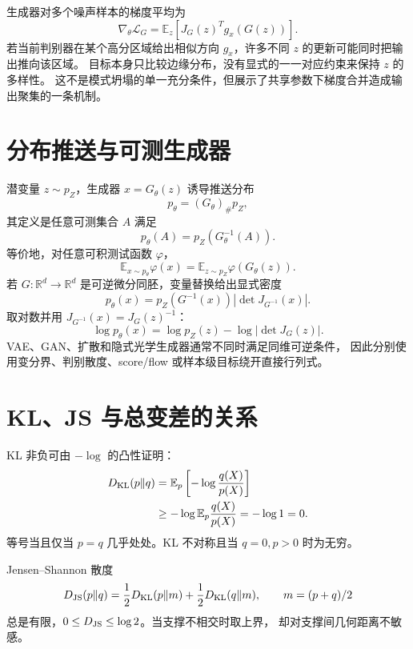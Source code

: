 \documentclass[11pt]{article}
\numberwithin{equation}{section}
\newcommand{\R}{\mathbb{R}}
\newcommand{\E}{\mathbb{E}}
\newcommand{\1}{\mathbf{1}}
\newcommand{\cL}{\mathcal{L}}
\begin{document}
生成器对多个噪声样本的梯度平均为
\begin{equation}
 \nabla_\theta\cL_G
 =\E_z[J_G(z)^Tg_x(G(z))].
\end{equation}
若当前判别器在某个高分区域给出相似方向 $g_x$，许多不同 $z$ 的更新可能同时把输出推向该区域。
目标本身只比较边缘分布，没有显式的一一对应约束来保持 $z$ 的多样性。
这不是模式坍塌的单一充分条件，但展示了共享参数下梯度合并造成输出聚集的一条机制。

\section{分布推送与可测生成器}

潜变量 $z\sim p_Z$，生成器 $x=G_\theta(z)$ 诱导推送分布
\begin{equation}
 p_\theta=(G_\theta)_\#p_Z,
\end{equation}
其定义是任意可测集合 $A$ 满足
\begin{equation}
 p_\theta(A)=p_Z(G_\theta^{-1}(A)).
\end{equation}
等价地，对任意可积测试函数 $\varphi$，
\begin{equation}
 \E_{x\sim p_\theta}\varphi(x)
 =\E_{z\sim p_Z}\varphi(G_\theta(z)).
\end{equation}
若 $G:\R^d\to\R^d$ 是可逆微分同胚，变量替换给出显式密度
\begin{equation}
 p_\theta(x)=p_Z(G^{-1}(x))
 \left|\det J_{G^{-1}}(x)\right|.
\end{equation}
取对数并用 $J_{G^{-1}}(x)=J_G(z)^{-1}$：
\begin{equation}
 \log p_\theta(x)=\log p_Z(z)-\log|\det J_G(z)|.
\end{equation}
VAE、GAN、扩散和隐式光学生成器通常不同时满足同维可逆条件，
因此分别使用变分界、判别散度、score/flow 或样本级目标绕开直接行列式。

\section{KL、JS 与总变差的关系}

KL 非负可由 $-\log$ 的凸性证明：
\begin{align}
 D_{\rm KL}(p\|q)
 &=\E_p\left[-\log\frac{q(X)}{p(X)}\right]\\
 &\ge-\log\E_p\frac{q(X)}{p(X)}=-\log1=0.
\end{align}
等号当且仅当 $p=q$ 几乎处处。KL 不对称且当 $q=0,p>0$ 时为无穷。

Jensen--Shannon 散度
\begin{equation}
 D_{\rm JS}(p\|q)=\frac12D_{\rm KL}(p\|m)
 +\frac12D_{\rm KL}(q\|m),\qquad m=(p+q)/2
\end{equation}
总是有限，$0\le D_{\rm JS}\le\log2$。当支撑不相交时取上界，
却对支撑间几何距离不敏感。
\end{document}
